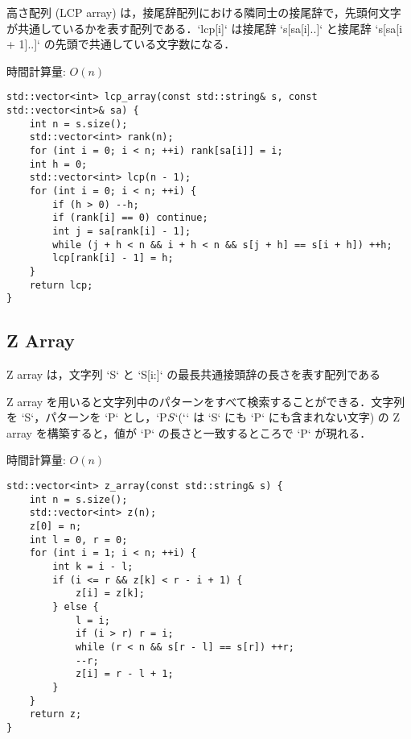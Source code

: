 \begin{small}
\begin{markdown}
高さ配列 (LCP array) は，接尾辞配列における隣同士の接尾辞で，先頭何文字が共通しているかを表す配列である．`lcp[i]` は接尾辞 `s[sa[i]..]` と接尾辞 `s[sa[i + 1]..]` の先頭で共通している文字数になる．

時間計算量: $O(n)$
\end{markdown}
\end{small}

\begin{lstlisting}
std::vector<int> lcp_array(const std::string& s, const std::vector<int>& sa) {
    int n = s.size();
    std::vector<int> rank(n);
    for (int i = 0; i < n; ++i) rank[sa[i]] = i;
    int h = 0;
    std::vector<int> lcp(n - 1);
    for (int i = 0; i < n; ++i) {
        if (h > 0) --h;
        if (rank[i] == 0) continue;
        int j = sa[rank[i] - 1];
        while (j + h < n && i + h < n && s[j + h] == s[i + h]) ++h;
        lcp[rank[i] - 1] = h;
    }
    return lcp;
}
\end{lstlisting}

\subsection{Z Array}

\begin{small}
\begin{markdown}
Z array は，文字列 `S` と `S[i:]` の最長共通接頭辞の長さを表す配列である

Z array を用いると文字列中のパターンをすべて検索することができる．文字列を `S`，パターンを `P` とし，`P$S` (`$` は `S` にも `P` にも含まれない文字) の Z array を構築すると，値が `P` の長さと一致するところで `P` が現れる．

時間計算量: $O(n)$
\end{markdown}
\end{small}

\begin{lstlisting}
std::vector<int> z_array(const std::string& s) {
    int n = s.size();
    std::vector<int> z(n);
    z[0] = n;
    int l = 0, r = 0;
    for (int i = 1; i < n; ++i) {
        int k = i - l;
        if (i <= r && z[k] < r - i + 1) {
            z[i] = z[k];
        } else {
            l = i;
            if (i > r) r = i;
            while (r < n && s[r - l] == s[r]) ++r;
            --r;
            z[i] = r - l + 1;
        }
    }
    return z;
}
\end{lstlisting}

